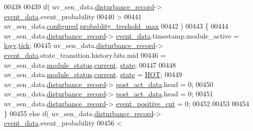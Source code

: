 \begin{DoxyCode}
00438 
00439                    \textcolor{keywordflow}{if}( uv\_sen\_data.\hyperlink{a00035_ac9b38e2c1d3f1013a88d33506c754152}{disturbance\_record}->
      \hyperlink{a00028_a8c0bda69e71ef674e60da47ad0be9ab0}{event\_data}.event\_probability
00440                         >
00441                        uv\_sen\_data.\hyperlink{a00035_a94b2d1f6ea4ab334c74d24984dd27843}{configured}.\hyperlink{a00021_a7e2d217b9c9051d361319180a426851c}{probablity\_treshold\_max}
00442                      )
00443                    \{
00444                          uv\_sen\_data.\hyperlink{a00035_ac9b38e2c1d3f1013a88d33506c754152}{disturbance\_record}->
      \hyperlink{a00028_a8c0bda69e71ef674e60da47ad0be9ab0}{event\_data}.timestamp.module\_active = \hyperlink{a00021_a2e89c46668b39a17753c238950c9e1ec}{logv}.\hyperlink{a00021_a81f0ce68c2c483fb8df726cc1988d8e8}{tick};
00445                          uv\_sen\_data.\hyperlink{a00035_ac9b38e2c1d3f1013a88d33506c754152}{disturbance\_record}->
      \hyperlink{a00028_a8c0bda69e71ef674e60da47ad0be9ab0}{event\_data}.state\_transition.history.bits.mid
00446                          = uv\_sen\_data.\hyperlink{a00035_a5a53c391562b059eb744ac679f3765ca}{module\_status}.\hyperlink{a00017_ab8af48cdbba92b3ae39c4470e53af944}{current}.
      \hyperlink{a00017_a6b8d8e916bc56265a3fd279bd26b6d1b}{state};
00447 
00448                          uv\_sen\_data.\hyperlink{a00035_a5a53c391562b059eb744ac679f3765ca}{module\_status}.\hyperlink{a00017_ab8af48cdbba92b3ae39c4470e53af944}{current}.
      \hyperlink{a00017_a6b8d8e916bc56265a3fd279bd26b6d1b}{state} = \hyperlink{a00021_a1eb14cc432874ddacd1934791dbe12a3}{HOT};
00449                          uv\_sen\_data.\hyperlink{a00035_ac9b38e2c1d3f1013a88d33506c754152}{disturbance\_record}->
      \hyperlink{a00028_a9c699c0cc82d0baa6e49195f185ab34f}{post\_act\_data}.head = 0;
00450                          uv\_sen\_data.\hyperlink{a00035_ac9b38e2c1d3f1013a88d33506c754152}{disturbance\_record}->
      \hyperlink{a00028_a9c699c0cc82d0baa6e49195f185ab34f}{post\_act\_data}.head = 0;
00451                          uv\_sen\_data.\hyperlink{a00035_ac9b38e2c1d3f1013a88d33506c754152}{disturbance\_record}->
      \hyperlink{a00028_a7397b9d76d4b57500f27bb23d258a18a}{event\_positive\_cnt} = 0;
00452 
00453 
00454                    \}
00455                    \textcolor{keywordflow}{else} \textcolor{keywordflow}{if}( uv\_sen\_data.\hyperlink{a00035_ac9b38e2c1d3f1013a88d33506c754152}{disturbance\_record}->
      \hyperlink{a00028_a8c0bda69e71ef674e60da47ad0be9ab0}{event\_data}.event\_probability
00456                             <

\end{DoxyCode}
